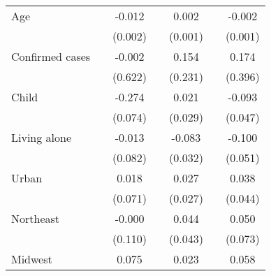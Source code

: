 {\begin{tabular}{l*{6}{c}}
Age                 &                     &      -0.012\sym{***}&                     &       0.002\sym{***}&                     &      -0.002\sym{**} \\
                    &                     &     (0.002)         &                     &     (0.001)         &                     &     (0.001)         \\
\addlinespace
Confirmed cases     &                     &      -0.002         &                     &       0.154         &                     &       0.174         \\
                    &                     &     (0.622)         &                     &     (0.231)         &                     &     (0.396)         \\
\addlinespace
Child               &                     &      -0.274\sym{***}&                     &       0.021         &                     &      -0.093\sym{**} \\
                    &                     &     (0.074)         &                     &     (0.029)         &                     &     (0.047)         \\
\addlinespace
Living alone        &                     &      -0.013         &                     &      -0.083\sym{***}&                     &      -0.100\sym{*}  \\
                    &                     &     (0.082)         &                     &     (0.032)         &                     &     (0.051)         \\
\addlinespace
Urban               &                     &       0.018         &                     &       0.027         &                     &       0.038         \\
                    &                     &     (0.071)         &                     &     (0.027)         &                     &     (0.044)         \\
\addlinespace
Northeast           &                     &      -0.000         &                     &       0.044         &                     &       0.050         \\
                    &                     &     (0.110)         &                     &     (0.043)         &                     &     (0.073)         \\
\addlinespace
Midwest             &                     &       0.075         &                     &       0.023         &                     &       0.058         \\

\end{tabular}}
